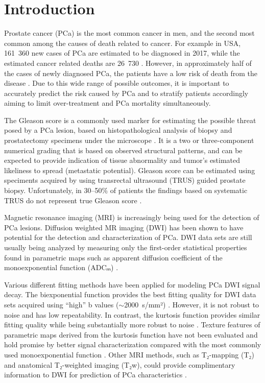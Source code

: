 \section{Introduction}

Prostate cancer (PCa) is the most common cancer in men, and the second most
common among the causes of death related to cancer. For example in USA, 161~360
new cases of PCa are estimated to be diagnosed in 2017, while the estimated
cancer related deaths are 26~730 \citep{Siegel2017}. However, in approximately
half of the cases of newly diagnosed PCa, the patients have a low risk of death
from the disease \citep{Walsh2007, Draisma2003}. Due to this wide range of
possible outcomes, it is important to accurately predict the risk caused by
PCa and to stratify patients accordingly aiming to limit over-treatment and
PCa mortality simultaneously.

The Gleason score is a commonly used marker for estimating the possible threat
posed by a PCa lesion, based on histopathological analysis of biopsy and
prostatectomy specimens under the microscope \citep{Epstein2005}. It is a two or
three-component numerical grading that is based on observed structural patterns,
and can be expected to provide indication of tissue abnormality and tumor's
estimated likeliness to spread (metastatic potential). Gleason score can be
estimated using speciments acquired by using transrectal ultrasound (TRUS)
guided prostate biopsy. Unfortunately, in 30--50\% of patients the findings
based on systematic TRUS do not represent true Gleason score \citep{Nepple2009,
Steinberg1997, Rajinikanth2008}.

Magnetic resonance imaging (MRI) is increasingly being used for the detection of
PCa lesions. Diffusion weighted MR imaging (DWI) has been shown to have
potential for the detection and characterization of PCa. DWI data sets are
still usually being analyzed by measuring only the first-order statistical
properties found in parametric maps such as apparent diffusion coefficient of
the monoexponential function (ADCₘ) \citep{Turkbey2011, Toivonen2015,
Jambor2015Relaxation}.

Various different fitting methods have been applied for modeling PCa DWI signal
decay. The biexponential function \citep{Mulkern2006} provides the best fitting
quality for DWI data sets acquired using ``high'' b values ($\sim$2000~s/mm²)
\citep{Jambor2015Evaluation}. However, it is not robust to noise and has low
repeatability. In contrast, the kurtosis function \citep{Jensen2005} provides
similar fitting quality while being substantially more robust to noise
\citep{Jambor2015Evaluation}. Texture features of parametric maps derived from
the kurtosis function have not been evaluated and hold promise by better signal
characterization compared with the most commonly used monoexponential function
\citep{Toivonen2015}. Other MRI methods, such as T₂-mapping (T₂) and anatomical
T₂-weighted imaging (T₂w), could provide complimentary information to DWI for
prediction of PCa characteristics \citep{Jambor2015Relaxation}.

